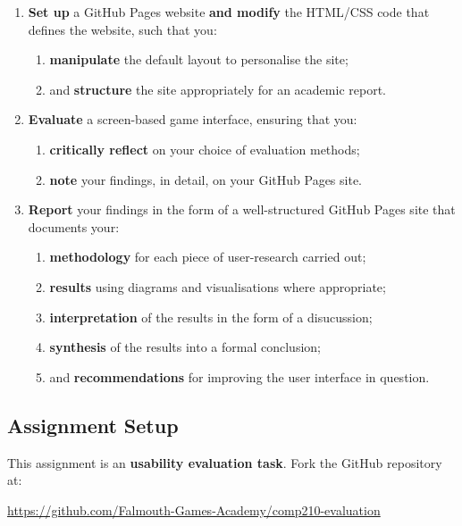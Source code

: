 \documentclass{../../fal_assignment}
\begin{document}
\begin{enumerate}[label=(\alph*)]
    \item \textbf{Set up} a GitHub Pages website \textbf{and modify} the HTML/CSS code that defines the website, such that you: 
    	\begin{enumerate}[label=\roman*.]
    		\item \textbf{manipulate} the default layout to personalise the site;
    		\item and \textbf{structure} the site appropriately for an academic report.
	\end{enumerate}
    \item \textbf{Evaluate} a screen-based game interface, ensuring that you:
    	\begin{enumerate}[label=\roman*.]
    		\item \textbf{critically reflect} on your choice of evaluation methods;
		\item \textbf{note} your findings, in detail, on your GitHub Pages site.
	\end{enumerate}
    \item \textbf{Report} your findings in the form of a well-structured GitHub Pages site that documents your:
    	\begin{enumerate}[label=\roman*.]
    		\item \textbf{methodology} for each piece of user-research carried out;
    		\item \textbf{results} using diagrams and visualisations where appropriate;
    		\item \textbf{interpretation} of the results in the form of a disucussion;
		\item \textbf{synthesis} of the results into a formal conclusion;
    		\item and \textbf{recommendations} for improving the user interface in question.
	\end{enumerate}
	
\end{enumerate}

\subsection*{Assignment Setup}

This assignment is an \textbf{usability evaluation task}. Fork the GitHub repository at:

\indent \url{https://github.com/Falmouth-Games-Academy/comp210-evaluation}
\end{document}
